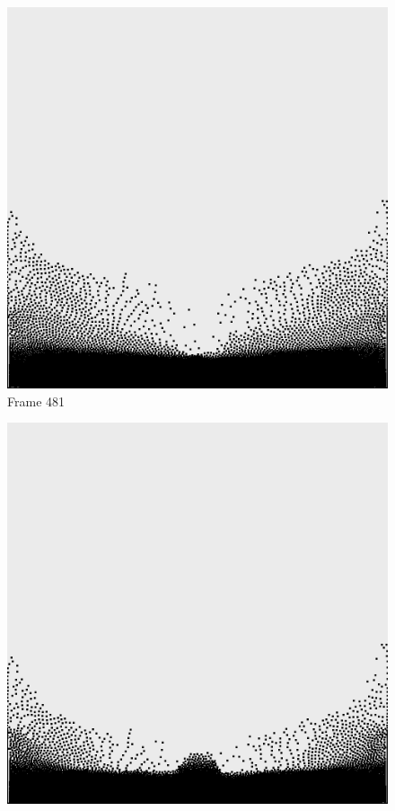 \documentclass[a4paper, 12pt, oneside]{book}
\begin{document}
\begin{figure}[!ht]
    \addvspace{0.5ex}
        \begin{center}
            \includegraphics[width=\linewidth]{images/test_case_1/481.png}
            Frame 481
        \end{center}
    \endminipage
    \hfill
        \begin{center}
            \includegraphics[width=\linewidth]{images/test_case_1/501.png}

\end{center}
\end{figure}
\end{document}
